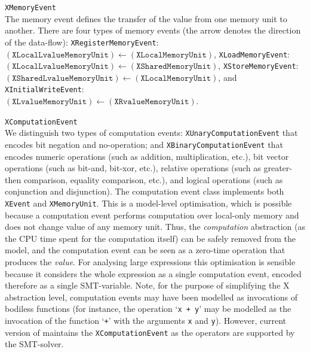 \begin{outline}
  \1 \texttt{XMemoryEvent} \\
  The memory event defines the transfer of the value from one memory unit to another.
  There are four types of memory events (the arrow denotes the direction of the data-flow):
  \2 \texttt{XRegisterMemoryEvent}: \\
    $(\texttt{XLocalLvalueMemoryUnit}) \leftarrow (\texttt{XLocalMemoryUnit})$,
  \2 \texttt{XLoadMemoryEvent}: \\
    $(\texttt{XLocalLvalueMemoryUnit}) \leftarrow (\texttt{XSharedMemoryUnit})$,
  \2 \texttt{XStoreMemoryEvent}: \\
    $(\texttt{XSharedLvalueMemoryUnit}) \leftarrow (\texttt{XLocalMemoryUnit})$, and
  \2 \texttt{XInitialWriteEvent}: \\
    $(\texttt{XLvalueMemoryUnit}) \leftarrow (\texttt{XRvalueMemoryUnit})$.

  
  \1 \texttt{XComputationEvent} \\
    We distinguish two types of computation events:
      \2 \texttt{XUnaryComputationEvent} that encodes bit negation and no-operation; and 
      \2 \texttt{XBinaryComputationEvent} that encodes numeric operations (such as addition, multiplication, etc.), bit vector operations (such as bit-and, bit-xor, etc.), relative operations (such as greater-then comparison, equality comparison, etc.), and logical operations (such as conjunction and disjunction). 
    \newline
    The computation event class implements both \texttt{XEvent} and \texttt{XMemoryUnit}.
    This is a model-level optimisation, which is possible because a computation event performs computation over local-only memory and does not change value of any memory unit.
    Thus, the \textit{computation} abstraction (as the CPU time spent for the computation itself) can be safely removed from the model, and the computation event can be seen as a zero-time operation that produces the \textit{value}.
    For analysing large expressions this optimisation is sensible because it considers the whole expression as a single computation event, encoded therefore as a single SMT-variable.
    \newline
    Note, for the purpose of simplifying the X abstraction level, computation events may have been modelled as invocations of bodiless functions (for instance, the operation `\lstinline{x + y}' may be modelled as the invocation of the function `\lstinline{+}' with the arguments \lstinline{x} and \lstinline{y}).
    However, current version of \porthos[2] maintains the \texttt{XComputationEvent} as the operators are supported by the SMT-solver.


\end{outline}
